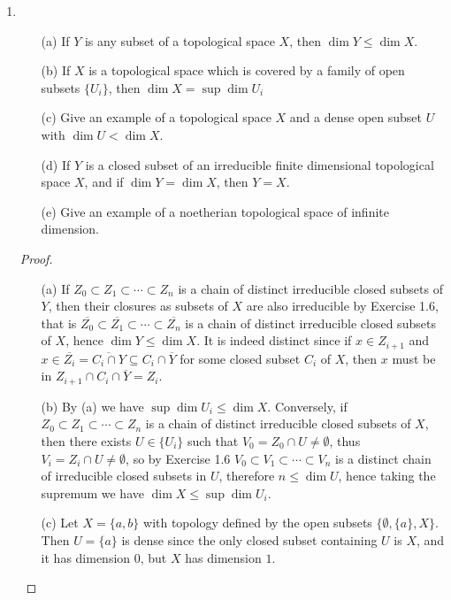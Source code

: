\documentclass[12pt]{article}
\theoremstyle{definition}
\begin{document}
\begin{enumerate} [label=\textbf{\arabic*.}, leftmargin=-0.05em]
\item
\begin{itemize}
    \item[(a)] If $Y$ is any subset of a topological space $X$, then $\dim{Y} \leq \dim{X}$.

    \item[(b)] If $X$ is a topological space which is covered by a family of open subsets $\{ U_i \}$, then $\dim{X} = \sup{\dim{U_i}}$

    \item[(c)] Give an example of a topological space $X$ and a dense open subset $U$ with $\dim{U} < \dim{X}$.

    \item[(d)] If $Y$ is a closed subset of an irreducible finite dimensional topological space $X$, and if $\dim{Y} = \dim{X}$, then $Y = X$.

    \item[(e)] Give an example of a noetherian topological space of infinite dimension.
\end{itemize}

\begin{proof} $ $ \vspace{0pt}
    \begin{itemize}
        \item[(a)] If $Z_0 \subset Z_1 \subset \cdots \subset Z_n$ is a chain of distinct irreducible closed subsets of $Y$, then their closures as subsets of $X$ are also irreducible by Exercise 1.6, that is $\overline{Z_0} \subset \overline{Z_1} \subset \cdots \subset \overline{Z_n}$ is a chain of distinct irreducible closed subsets of $X$, hence $\dim{Y} \leq \dim{X}$. It is indeed distinct since if $x \in Z_{i + 1}$ and $x \in \overline{Z_i} = \overline{C_i \cap Y} \subseteq C_i \cap \overline{Y}$ for some closed subset $C_i$ of $X$, then $x$ must be in $Z_{i + 1} \cap C_i \cap \overline{Y} = Z_i$.

        \item[(b)] By (a) we have $\sup{\dim{U_i}} \leq \dim{X}$. Conversely, if $Z_0 \subset Z_1 \subset \cdots \subset Z_n$ is a chain of distinct irreducible closed subsets of $X$, then there exists $U \in \{U_i\}$ such that $V_0 = Z_0 \cap U \neq \emptyset$, thus $V_i = Z_i \cap U \neq \emptyset$, so by Exercise 1.6 $V_0 \subset V_1 \subset \cdots \subset V_n$ is a distinct chain of irreducible closed subsets in $U$, therefore $n \leq \dim{U}$, hence taking the supremum we have $\dim{X} \leq \sup{\dim{U_i}}$.

        \item[(c)] Let $X = \{ a, b \}$ with topology defined by the open subsets $\{ \emptyset, \{a \}, X \}$. Then $U = \{a \}$ is dense since the only closed subset containing $U$ is $X$, and it has dimension $0$, but $X$ has dimension $1$.


\end{itemize}
\end{proof}
\end{enumerate}
\end{document}
